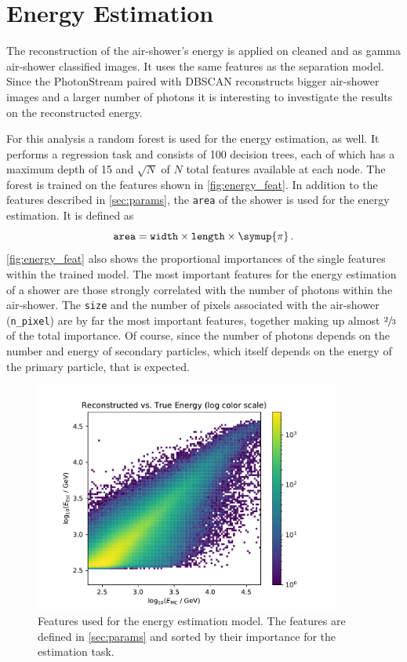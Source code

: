 \section{Energy Estimation}
%
The reconstruction of the air-shower's energy is applied on cleaned and as
gamma air-shower classified images. It uses the same features as the separation
model. Since the PhotonStream paired with DBSCAN reconstructs bigger air-shower
images and a larger number of photons it is interesting to investigate the
results on the reconstructed energy.

For this analysis a random forest is used for the energy estimation, as well.
It performs a regression task and consists of \num{100} decision trees, each of which has a maximum depth of \num{15} and $\sqrt{N}$ of $N$ total features available at each node. The forest is trained on the
features shown in \autoref{fig:energy_feat}. In addition to the features described in \autoref{sec:params}, the \texttt{area} of the shower is used for the energy estimation. It is defined as
%
\begin{equation}
  \texttt{area} = \texttt{width}\times\texttt{length}\times\symup{\pi}\, .
\end{equation}
%
\autoref{fig:energy_feat} also shows the
proportional importances of the single features within the trained model. The
most important features for the energy estimation of a shower are those
strongly correlated with the number of photons within the air-shower. The
\texttt{size} and the number of pixels associated with the air-shower
(\texttt{n\_pixel}) are by far the most important features, together making up
almost $\sfrac{2}{3}$ of the total importance. Of course, since the number of
photons depends on the number and energy of secondary particles, which itself
depends on the energy of the primary particle, that is expected.
%
\begin{figure}
  \centering
  \includegraphics[width=0.9\textwidth, page=4]{Plots/results/DBSCAN/energy_performance.pdf}
  \caption{Features used for the energy estimation model. The features are defined in \autoref{sec:params} and sorted by their importance for the estimation task.}
  \label{fig:energy_feat}
\end{figure}
%

